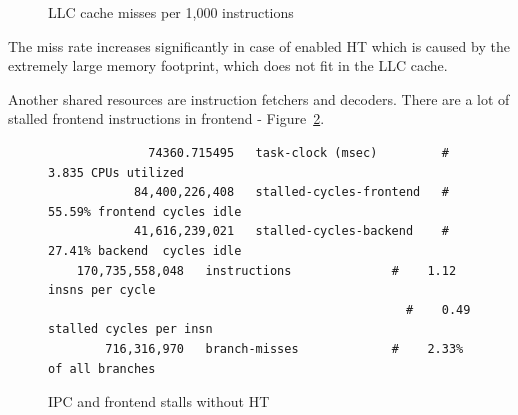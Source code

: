 \documentclass[12pt]{article}
\begin{document}
\begin{figure}[h]
    \centering
	\caption{LLC cache misses per 1,000 instructions}
    \label{fig:llc}
\end{figure}

The miss rate increases significantly in case of enabled HT which is caused by the extremely large memory footprint, which does not fit in the LLC cache.

Another shared resources are instruction fetchers and decoders. There are a lot of stalled frontend instructions in frontend - Figure~\ref{fig:front1}. 

\begin{figure}[h]
	\begin{verbatim}
    		  74360.715495   task-clock (msec)         #    3.835 CPUs utilized                                             
    		84,400,226,408   stalled-cycles-frontend   #   55.59% frontend cycles idle    
    		41,616,239,021   stalled-cycles-backend    #   27.41% backend  cycles idle    
   	170,735,558,048   instructions              #    1.12  insns per cycle        
     	                                          #    0.49  stalled cycles per insn                   
        716,316,970   branch-misses             #    2.33% of all branches         
	\end{verbatim}
	\caption{IPC and frontend stalls without HT}
    \label{fig:front1}
\end{figure}
\end{document}
